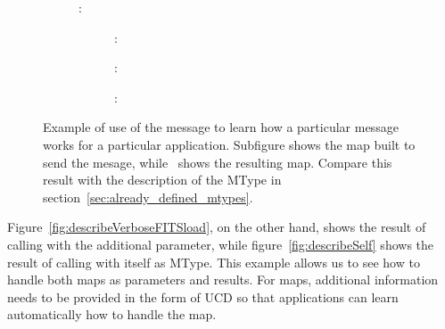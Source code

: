 \begin{figure}[tbp]
{\begin{minipage}{0.67\columnwidth}
\begin{small}
\begin{description}
\begin{description}
\begin{description}
								\item[]:
								\begin{description}
									\item[]:
									\item[]:
									\item[]:
								\end{description}
							\end{description} 
						\end{description}
					\end{description}
					\end{small}
				\end{minipage}
			} 
			\caption[Using \texttt{movoir.describe.mtype}
			in .]
			{
				Example of use of the
				 message to learn how
				a particular message works for a particular
				application. Subfigure
				 shows
				the map built to send the
				 mesage,
				while~
				shows the resulting map. Compare this result with
				the description of the 
				MType in section~\ref{sec:already_defined_mtypes}.
			}
			\label{fig:describeMtypeVOTableLoad}
		\end{figure}
		
		Figure~\ref{fig:describeVerboseFITSload}, on the other
		hand, shows the result of calling
		 with the additional
		 parameter, while
		figure~\ref{fig:describeSelf} shows the result of calling
		 with itself as MType. This
		example allows us to see how to handle both maps as 
		parameters and results. For maps, additional information 
		needs to be provided in the form of UCD so that applications
		can learn automatically how to handle the map.
		
